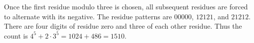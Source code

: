 Once the first residue modulo three is chosen, all subsequent residues are forced to alternate with its negative. The residue patterns are $00000$, $12121$, and $21212$. There are four digits of residue zero and three of each other residue. Thus the count is $4^5+2\cdot3^5=1024+486=\boxed{1510}$.
